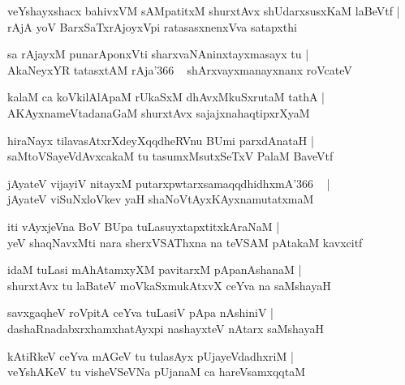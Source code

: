 \documentclass[twoside,12pt,openright]{book}
\newcounter{shloka}[chapter]
\begin{document}
\begin{shloka}%
veYshayxshacx bahivxVM sAMpatitxM shurxtAvx shUdarxsusxKaM laBeVtf |\\
rAjA yoV BarxSaTxrAjoyxVpi ratasasxnenxVva satapxthi
\end{shloka}

\begin{shloka}%
sa rAjayxM punarAponxVti sharxvaNAninxtayxmasayx tu |\\
AkaNeyxYR tatasxtAM rAja\char'366 ~ shArxvayxmanayxnanx roVcateV 
\end{shloka}

\begin{shloka}%
kalaM ca koVkilAlApaM rUkaSxM dhAvxMkuSxrutaM tathA |\\
AKAyxnameVtadanaGaM shurxtAvx sajajxnahaqtipxrXyaM 
\end{shloka}

\begin{shloka}%
hiraNayx tilavasAtxrXdeyXqqdheRVnu BUmi parxdAnataH |\\
saMtoVSayeVdAvxcakaM tu tasumxMsutxSeTxV PalaM BaveVtf
\end{shloka}

\begin{shloka}%
jAyateV vijayiV nitayxM putarxpwtarxsamaqqdhidhxmA\char'366 ~ |\\
jAyateV viSuNxloVkev yaH shaNoVtAyxKAyxnamutatxmaM 
\end{shloka}

\begin{shloka}%
iti vAyxjeVna BoV BUpa tuLasuyxtapxtitxkAraNaM |\\
yeV shaqNavxMti nara sherxVSAThxna na teVSAM pAtakaM kavxcitf 
\end{shloka}

\begin{shloka}%
idaM tuLasi mAhAtamxyXM pavitarxM pApanAshanaM |\\
shurxtAvx tu laBateV moVkaSxmukAtxvX ceYva na saMshayaH 
\end{shloka}

\begin{shloka}%
savxgaqheV roVpitA ceYva tuLasiV pApa nAshiniV |\\
dashaRnadabxrxhamxhatAyxpi nashayxteV nAtarx saMshayaH 
\end{shloka}

\begin{shloka}%
kAtiRkeV ceYva mAGeV tu tulasAyx pUjayeVdadhxriM |\\
veYshAKeV tu visheVSeVNa pUjanaM ca hareVsamxqqtaM 
\end{shloka}
\end{document}
